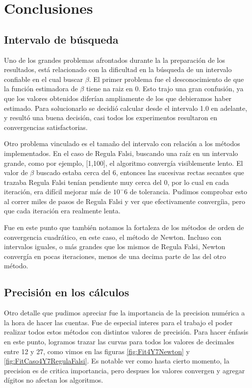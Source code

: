 \section{Conclusiones}

\subsection{Intervalo de b\'usqueda}

Uno de los grandes problemas afrontados durante la la preparaci\'on de los 
resultados, est\'a relacionado con la dificultad en la b\'usqueda de un intervalo
confiable en el cual buscar $\beta$. El primer problema fue el desconocimiento
de que la funci\'on estimadora de $\beta$ tiene na raiz en 0. Esto trajo una
gran confusi\'on, ya que los valores obtenidos difer\'ian ampliamente 
de los que debieramos haber estimado. Para solucionarlo se decidi\'o calcular
desde el intervalo 1.0 en adelante, y result\'o una buena decisi\'on, casi 
todos los experimentos resultaron en convergencias satisfactorias.

Otro problema vinculado es el tama\~no del intervalo con relaci\'on a los 
m\'etodos implementados. 
En el caso de Regula Falsi, buscando una ra\'iz en un intervalo grande, como por 
ejemplo, [1,100], el algoritmo 
converg\'ia visiblemente lento. El valor de $\beta$ buscado estaba cerca 
del 6, entonces las sucesivas rectas secantes que trazaba Regula Falsi ten\'ian 
pendiente muy cerca del 0, por lo cual en cada iteraci\'on, era dif\'icil 
mejorar m\'as de $10^-6$ de tolerancia. Pudimos comprobar esto al 
correr miles de pasos de Regula Falsi y ver que efectivamente converg\'iia, pero
que cada iteraci\'on era realmente lenta.

Fue en este punto que tambi\'en notamos la fortaleza de los m\'etodos de orden de 
convergencia cuadr\'atico, en este caso, el m\'etodo de Newton. 
Incluso con intervalos iguales, o m\'as 
grandes que los mismos de Regula Falsi, Newton converg\'ia en pocas iteraciones, 
menos de una decima parte de las del otro m\'etodo.

\subsection{Precisi\'on en los c\'alculos}

Otro detalle que pudimos apreciar fue la importancia de la precision num\'erica 
a la hora de hacer las cuentas. 
Fue de especial interes para el trabajo el poder realizar todos estos m\'etodos 
con distintos valores 
de precisi\'on. Para hacer \'enfasis en este punto, logramos trazar las curvas 
para todos los valores de decimales 
entre 12 y 27, como vimos en las figuras \ref{fig:Fit4Y7Newton} y \ref{fig:FitCaso4Y7RegulaFalsi}.
Es notable ver como hasta cierto momento, la precision es de critica 
importancia, pero despues los valores convergen y 
agregar d\'igitos no afectan los algoritmos.

